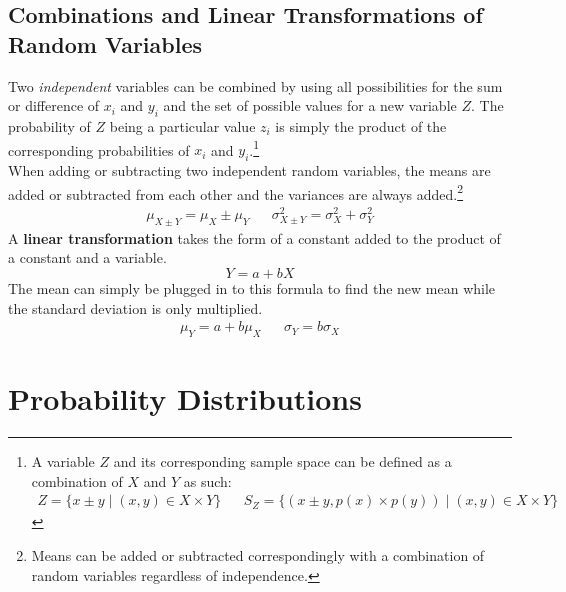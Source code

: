 \documentclass[../AP_Statistics.tex]{subfiles}
\begin{document}
		\section{Combinations and Linear Transformations of Random Variables}
			Two \emph{independent} variables can be combined by using all possibilities for the sum or difference of $x_i$ and $y_i$ and the set of possible values for a new variable $Z$. The probability of $Z$ being a particular value $z_i$ is simply the product of the corresponding probabilities of $x_i$ and $y_i$.\footnote{A variable $Z$ and its corresponding sample space can be defined as a combination of $X$ and $Y$ as such:\begin{align*}Z = \{x\pm y\mid(x, y) \in X \times Y\} && S_Z = \{(x \pm y, p(x) \times p(y)) \mid (x, y) \in X \times Y\}\end{align*}} \\
			When adding or subtracting two independent random variables, the means are added or subtracted from each other and the variances are always added.\footnote{Means can be added or subtracted correspondingly with a combination of random variables regardless of independence.} \\
			\begin{align*}
				\mu_{X \pm Y} = \mu_X \pm \mu_Y && \sigma_{X \pm Y}^2 = \sigma_X^2 + \sigma_Y^2
			\end{align*}
			A \textbf{linear transformation} takes the form of a constant added to the product of a constant and a variable.
			\[Y = a + bX\]
			The mean can simply be plugged in to this formula to find the new mean while the standard deviation is only multiplied.
			\begin{align*}
				\mu_Y = a + b\mu_X && \sigma_Y = b\sigma_X
			\end{align*}
	\chapter{Probability Distributions}
\end{document}

